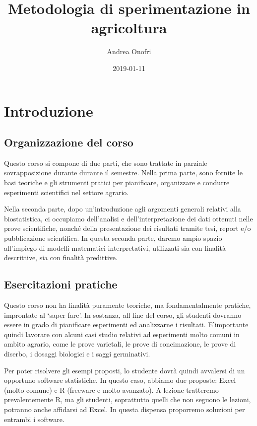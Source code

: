 \documentclass[a4paper,12pt,oneside]{book}
\author{Andrea Onofri}
\date{2019-01-11}
\title{Metodologia di sperimentazione in agricoltura}
\subtitle{}
\begin{document}
\maketitle
\tableofcontents

\chapter{Introduzione}\label{introduzione}

\section{Organizzazione del corso}\label{organizzazione-del-corso}

Questo corso si compone di due parti, che sono trattate in parziale
sovrapposizione durante durante il semestre. Nella prima parte, sono
fornite le basi teoriche e gli strumenti pratici per pianificare,
organizzare e condurre esperimenti scientifici nel settore agrario.

Nella seconda parte, dopo un'introduzione agli argomenti generali
relativi alla biostatistica, ci occupiamo dell'analisi e
dell'interpretazione dei dati ottenuti nelle prove scientifiche, nonché
della presentazione dei risultati tramite tesi, report e/o pubblicazione
scientifica. In questa seconda parte, daremo ampio spazio all'impiego di
modelli matematici interpretativi, utilizzati sia con finalità
descrittive, sia con finalità predittive.

\section{Esercitazioni pratiche}\label{esercitazioni-pratiche}

Questo corso non ha finalità puramente teoriche, ma fondamentalmente
pratiche, improntate al `saper fare'. In sostanza, all fine del corso,
gli studenti dovranno essere in grado di pianificare esperimenti ed
analizzarne i risultati. E'importante quindi lavorare con alcuni casi
studio relativi ad esperimenti molto comuni in ambito agrario, come le
prove varietali, le prove di concimazione, le prove di diserbo, i
dosaggi biologici e i saggi germinativi.

Per poter risolvere gli esempi proposti, lo studente dovrà quindi
avvalersi di un opportuno software statistiche. In questo caso, abbiamo
due proposte: Excel (molto comune) e R (freeware e molto avanzato). A
lezione tratteremo prevalentemente R, ma gli studenti, soprattutto
quelli che non seguono le lezioni, potranno anche affidarsi ad Excel. In
questa dispensa proporremo soluzioni per entrambi i software.
\end{document}
